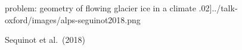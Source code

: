 \documentclass[svgnames,
               hyperref={colorlinks,citecolor=DeepPink4,linkcolor=FireBrick,urlcolor=Maroon},
               usepdftitle=false]  %
               {beamer}
\begin{document}
\begin{frame}{problem: geometry of flowing glacier ice in a climate}
.02\textwidth]{../talk-oxford/images/alps-seguinot2018.png}

\vspace{-2mm}
\hfill {\tiny Sequinot et al.~(2018)}
\end{frame}
\end{document}
